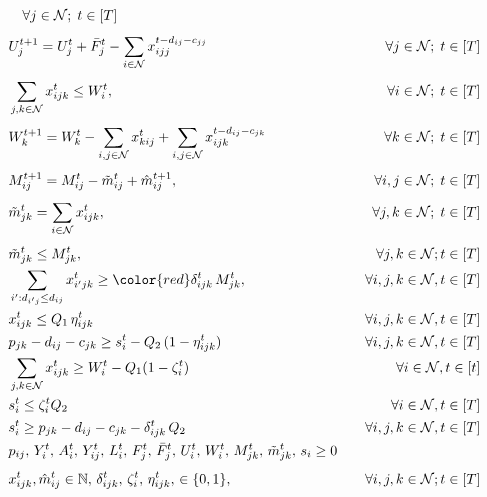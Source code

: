 \documentclass[trsc,nonblindrev]{informs3noheader}
\begin{document}
\begin{itemize}
\begin{subequations}
\begin{align}
            &\quad \forall j \in \mathcal{N};\;t\in[T]\label{FlowTransition}\\[4pt]
    &U_j^{t+1} %
        = U_j^{t}
        + \bar{F}_j^{t} %
        - \sum_{i\in \mathcal{N}}x_{ijj}^{t-d_{ij}-c_{jj}} %
            &  \quad \forall j \in \mathcal{N}; \;t\in[T] \\[4pt]
    &\sum_{j,k\in \mathcal{N}} x_{ijk}^t \le 
        W_i^t, &\quad \forall i\in \mathcal{N};\; t\in [T]\\[4pt]
    &W_k^{t+1}
        = W_k^t
        - \sum_{i,j\in \mathcal{N}} x_{kij}^{t}
        + \sum_{i,j\in \mathcal{N}} x_{ijk}^{t-d_{ij}-c_{jk}}
       &\quad \forall k\in \mathcal{N};\; t\in [T]\\[4pt]
    &M_{ij}^{t+1}
        = M_{ij}^t - \tilde{m}_{ij}^{t} + \hat{m}_{ij}^{t+1},
        & \quad \forall i,j\in \mathcal{N};\; t\in[T]\\[4pt]
    &\tilde{m}_{jk}^t 
        = \sum_{i\in \mathcal{N}} x_{ijk}^t,
        &\quad \forall j,k\in \mathcal{N};\; t\in[T]\label{tilde m def}\\[4pt]
    &\tilde{m}_{jk}^{t} \leq M_{jk}^{t}, &\quad \forall j,k\in \mathcal{N}; t\in [T]\label{PostConstraint}\\
    & \sum_{i':d_{i'j}\le d_{ij}} x^t_{i'jk} \geq {\color{red}\delta_{ijk}^t \, M_{jk}^t}, &\forall i,j,k\in \mathcal{N},t\in [T] \label{deltaM}\\
    & x_{ijk}^t \le Q_1 \,\eta_{ijk}^t & \forall i,j,k\in \mathcal{N},t\in [T] \label{Qeta}\\
    & p_{jk} - d_{ij} - c_{jk} \ge s_i^t - Q_2\,(1-\eta^t_{ijk}) & \forall i,j,k\in \mathcal{N},t\in[T] \label{si as lower bound}\\
    & \sum_{j,k\in\mathcal{N}}x^t_{ijk} \ge W_i^t - Q_1 (1-\zeta_i^t) 
    & \forall i\in\mathcal{N},t\in[t]\label{is there lazy worker}\\
    & s_i^t \le  \zeta_i^t Q_2 & \forall i\in\mathcal{N}, t\in[T] \label{stability end}\\
    &s_i^t \ge p_{jk} - d_{ij} - c_{jk} - \delta_{ijk}^t\,Q_2 & \forall i,j,k\in \mathcal{N},t\in [T]\label{si bigger if not full}\\
    & p_{ij},\,
    Y_i^t,\,
    A_i^t,\,
    Y_{ij}^t,\,
    L_i^t,\,
    F_j^t,\,
    \bar{F}_j^t,\,
    U_i^t,\,
    W_i^t,\,
    M_{jk}^t,\,
    \tilde{m}_{jk}^t,\,
    s_i
    \ge 0 & \nonumber\\[4pt]
    &x_{ijk}^t, \hat{m}_{ij}^t\in \mathbb{N},\,
    \delta_{ijk}^t,\,
    \zeta_i^t,\,
    \eta_{ijk}^t,\,
    \in \{0,1\}, \,
    & \quad \forall i,j,k\in \mathcal{N}; t\in [T]
\end{align}
\end{subequations}
\end{itemize}
\end{document}

